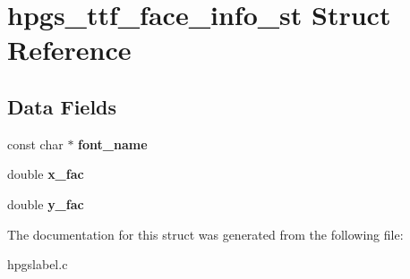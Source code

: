\section{hpgs\_\-ttf\_\-face\_\-info\_\-st Struct Reference}
\label{structhpgs__ttf__face__info__st}
\subsection*{Data Fields}
\begin{DoxyCompactItemize}
\item 
const char $\ast$ {\bfseries font\_\-name}\label{structhpgs__ttf__face__info__st_a04a9f8b2df96a983c9755082c98a7b70}

\item 
double {\bfseries x\_\-fac}\label{structhpgs__ttf__face__info__st_ab4660f796181c7b6770be4e8b9c0a0e2}

\item 
double {\bfseries y\_\-fac}\label{structhpgs__ttf__face__info__st_a11d4c26fc86a231176fc9ce031681ce3}

\end{DoxyCompactItemize}


The documentation for this struct was generated from the following file:\begin{DoxyCompactItemize}
\item 
hpgslabel.c\end{DoxyCompactItemize}
